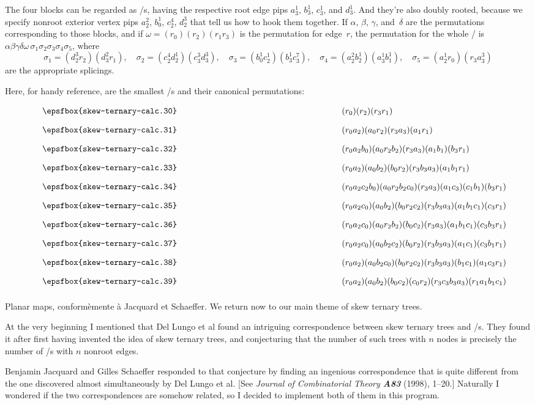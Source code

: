 The four blocks can be regarded as \RNBPM/s, having the respective
root edge pips $a^1_3$, $b^1_3$, $c^1_3$, and $d^1_3$.
And they're also doubly rooted, because we specify nonroot exterior
vertex pips $a^2_2$, $b^1_0$, $c^4_2$, $d^3_2$ that tell us how to
hook them together. If $\alpha$, $\beta$, $\gamma$, and~$\delta$ are
the permutations corresponding to those blocks, and if
$\omega=(r_0)(r_2)(r_1r_3)$ is the permutation for edge~$r$,
the permutation for the
whole \RNBPM/ is
$\alpha\beta\gamma\delta\omega\,\sigma_1\sigma_2\sigma_3\sigma_4\sigma_5$,
where
$$\sigma_1=(d^3_2r_2)(d^2_3r_1),\quad
\sigma_2=(c^4_2d^1_2)(c^3_3d^3_3),\quad
\sigma_3=(b^1_0c^1_2)(b^1_3c^7_3),\quad
\sigma_4=(a^2_2b^1_2)(a^1_3b^1_1),\quad
\sigma_5=(a^1_2r_0)(r_3a^3_3)
$$
are the appropriate splicings.

\fi

Here, for handy reference, are the smallest \RNBPM/s and their
canonical permutations:
$$\def\\#1{$\vcenter{\medskip\epsfbox{skew-ternary-calc.3#1}\medskip}$}
\vcenter{\halign{\hfil\\#\hfil&\qquad$#$\hfil\cr
0&(r_0)(r_2)(r_3r_1)\cr
1&(r_0a_2)(a_0r_2)(r_3a_3)(a_1r_1)\cr
2&(r_0a_2b_0)(a_0r_2b_2)(r_3a_3)(a_1b_1)(b_3r_1)\cr
3&(r_0a_2)(a_0b_2)(b_0r_2)(r_3b_3a_3)(a_1b_1r_1)\cr
4&(r_0a_2c_2b_0)(a_0r_2b_2c_0)(r_3a_3)(a_1c_3)(c_1b_1)(b_3r_1)\cr
5&(r_0a_2c_0)(a_0b_2)(b_0r_2c_2)(r_3b_3a_3)(a_1b_1c_1)(c_3r_1)\cr
6&(r_0a_2c_0)(a_0r_2b_2)(b_0c_2)(r_3a_3)(a_1b_1c_1)(c_3b_3r_1)\cr
7&(r_0a_2c_0)(a_0b_2c_2)(b_0r_2)(r_3b_3a_3)(a_1c_1)(c_3b_1r_1)\cr
8&(r_0a_2)(a_0b_2c_0)(b_0r_2c_2)(r_3b_3a_3)(b_1c_1)(a_1c_3r_1)\cr
9&(r_0a_2)(a_0b_2)(b_0c_2)(c_0r_2)(r_3c_3b_3a_3)(r_1a_1b_1c_1)\cr
}}$$

\fi

Planar maps, conform\`emente \`a Jacquard et Schaeffer.
We return now to our main theme of skew ternary trees.

At the very beginning I mentioned that Del Lungo et al found an
intriguing correspondence between skew ternary trees and \RNBPM/s.
They found it after first having invented the idea of skew ternary
trees, and conjecturing that the number of such trees with $n$ nodes
is precisely the number of \RNBPM/s with $n$ nonroot edges.

Benjamin Jacquard and Gilles Schaeffer responded to that conjecture
by finding an ingenious correspondence that is quite different
from the one discovered almost simultaneously by Del Lungo et al.
[See {\sl Journal of Combinatorial Theory\/ \bf A83}
(1998), 1--20.] Naturally I wondered if the two correspondences are
somehow related, so I decided to implement both of them in this program.


